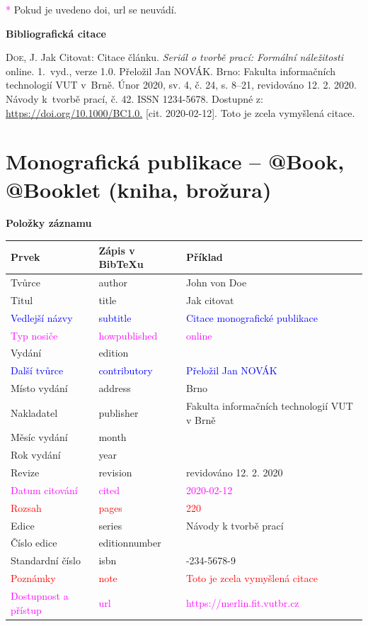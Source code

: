 \bigskip
\textcolor{magenta}{*} Pokud je uvedeno doi, url se neuvádí.
\bigskip

\noindent \textbf{Bibliografická citace}

\medskip

\noindent \textsc{Doe}, J. Jak Citovat: Citace článku. \textit{Seriál o tvorbě prací: Formální náležitosti} online. 1.~vyd., verze 1.0. Přeložil Jan NOVÁK. Brno: Fakulta informačních technologií VUT v~Brně. Únor 2020, sv. 4, č. 24, s. 8–21, revidováno 12. 2. 2020. Návody k~tvorbě prací, č. 42. ISSN 1234-5678. Dostupné z: \url{https://doi.org/10.1000/BC1.0.} [cit. 2020-02-12]. Toto je zcela vymyšlená citace.

\newpage
\section*{Monografická publikace -- @Book, @Booklet (kniha, brožura)}
\label{pr-monografie}
\noindent \textbf{Položky záznamu}

\medskip

\begin{tabularx}{0.95\linewidth}{X X >{\raggedright\arraybackslash}X}
   Prvek & Zápis v BibTeXu & Příklad\\\hline
   Tvůrce & author & John von Doe\\
   Titul & title & Jak citovat\\
   \textcolor{blue}{Vedlejší názvy} & \textcolor{blue}{subtitle} & \textcolor{blue}{Citace monografické publikace}\\
   \textcolor{magenta}{Typ nosiče} & \textcolor{magenta}{howpublished} & \textcolor{magenta}{online}\\
   Vydání & edition & 1\\
   \textcolor{blue}{Další tvůrce} & \textcolor{blue}{contributory} & \textcolor{blue}{Přeložil Jan NOVÁK}\\
   Místo vydání & address & Brno\\
   Nakladatel & publisher & Fakulta informačních technologií VUT v Brně\\
   Měsíc vydání & month & 2\\
   Rok vydání & year & 2020\\
   Revize & revision & revidováno 12. 2. 2020\\
   \textcolor{magenta}{Datum citování} & \textcolor{magenta}{cited} & \textcolor{magenta}{2020-02-12}\\
   \textcolor{red}{Rozsah} & \textcolor{red}{pages} & \textcolor{red}{220}\\
   Edice & series & Návody k tvorbě prací\\
   Číslo edice & editionnumber & 2\\
   Standardní číslo & isbn & 01-234-5678-9\\
   \textcolor{red}{Poznámky} & \textcolor{red}{note} & \textcolor{red}{Toto je zcela vymyšlená citace}\\
   \textcolor{magenta}{Dostupnost a přístup} & \textcolor{magenta}{url} & \textcolor{magenta}{https://merlin.fit.vutbr.cz}\\
\end{tabularx}

